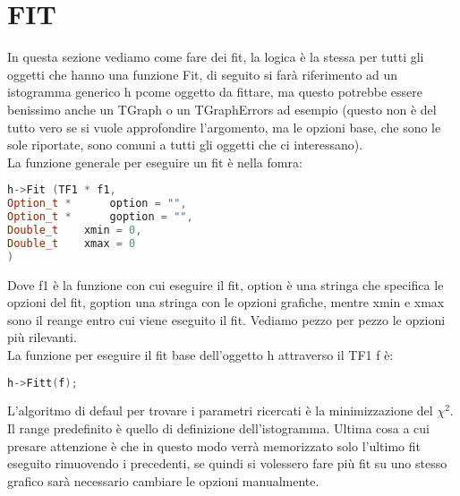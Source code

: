 \chapter{FIT}
In questa sezione vediamo come fare dei fit, la logica è la stessa per tutti gli oggetti che hanno una funzione Fit, di seguito si farà riferimento ad un istogramma generico h pcome oggetto da fittare, ma questo potrebbe essere benissimo anche un TGraph o un TGraphErrors ad esempio (questo non è del tutto vero se si vuole approfondire l'argomento, ma le opzioni base, che sono le sole riportate, sono comuni a tutti gli oggetti che ci interessano).\\
La funzione generale per eseguire un fit è nella fomra:
\begin{lstlisting}[language=C++,label={cod1},mathescape=true,breaklines=true]
h->Fit (TF1 * f1,
Option_t *  	option = "",
Option_t *  	goption = "",
Double_t  	xmin = 0,
Double_t  	xmax = 0 
) 	
\end{lstlisting}
Dove f1 è la funzione con cui eseguire il fit, option è una stringa che specifica le opzioni del fit, goption una stringa con le opzioni grafiche, mentre xmin e xmax sono il reange entro cui viene eseguito il fit. Vediamo pezzo per pezzo le opzioni più rilevanti.\\
La funzione per eseguire il fit base dell'oggetto h attraverso il TF1 f è:
\begin{lstlisting}[language=C++,label={cod1},mathescape=true,breaklines=true]
	h->Fitt(f);
\end{lstlisting}
L'algoritmo di defaul per trovare i parametri ricercati è la minimizzazione del $\chi^2$. Il range predefinito è quello di definizione dell'istogramma. Ultima cosa a cui presare attenzione è che in questo modo verrà memorizzato solo l'ultimo fit eseguito rimuovendo i precedenti, se quindi si volessero fare più fit su uno stesso grafico sarà necessario cambiare le opzioni manualmente.\\
